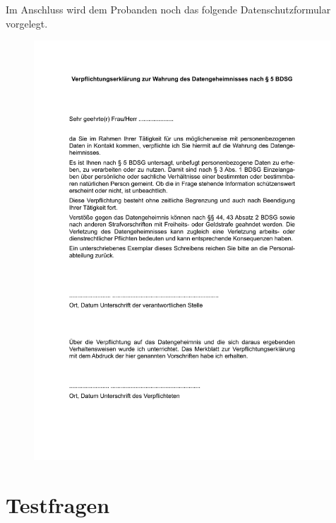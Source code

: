 Im Anschluss wird dem Probanden noch das folgende Datenschutzformular vorgelegt.


\begin{figure}
  \vspace{-20pt}
  \begin{center}
    \includegraphics[page=1,width=0.99\textwidth]{./images/datenschutz}
  \end{center}
  \vspace{-40pt}
\end{figure}

\clearpage

\section{Testfragen}

